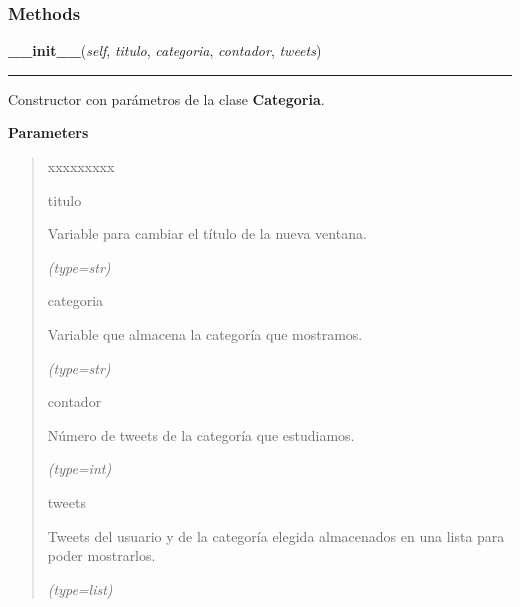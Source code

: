   \subsubsection{Methods}

    \label{categoria:Categoria:__init__}

    \vspace{0.5ex}

\hspace{.8\funcindent}\begin{boxedminipage}{\funcwidth}

    \raggedright \textbf{\_\_init\_\_}(\textit{self}, \textit{titulo}, \textit{categoria}, \textit{contador}, \textit{tweets})

    \vspace{-1.5ex}

    \rule{\textwidth}{0.5\fboxrule}
\setlength{\parskip}{2ex}
    Constructor con parámetros de la clase \textbf{Categoria}.

\setlength{\parskip}{1ex}
      \textbf{Parameters}
      \vspace{-1ex}

      \begin{quote}
        \begin{Ventry}{xxxxxxxxx}

          \item[titulo]

          Variable para cambiar el título de la nueva ventana.

            {\it (type=str)}

          \item[categoria]

          Variable que almacena la categoría que mostramos.

            {\it (type=str)}

          \item[contador]

          Número de tweets de la categoría que estudiamos.

            {\it (type=int)}

          \item[tweets]

          Tweets del usuario y de la categoría elegida almacenados en una 
          lista para poder mostrarlos.

            {\it (type=list)}

        \end{Ventry}

      \end{quote}

    \end{boxedminipage}

